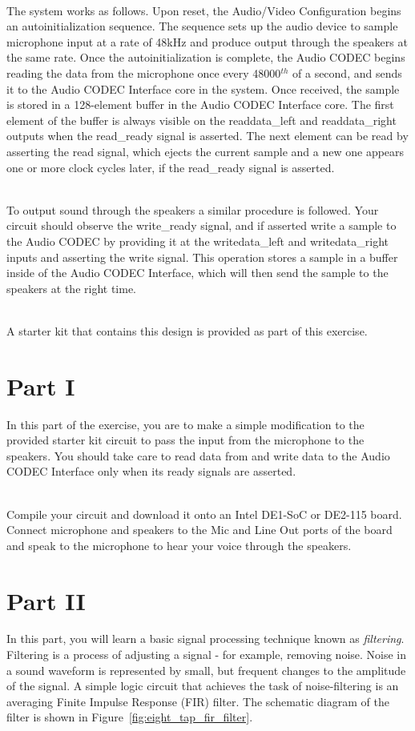 \documentclass[epsfig,10pt,fullpage]{article}
\begin{document}
~\\
The system works as follows. Upon reset, the {\sf Audio/Video Configuration} begins an autoinitialization sequence. The sequence sets up the
audio device to sample microphone input at a rate of 48kHz and produce output through 
the speakers at the same rate.
Once the autoinitialization is complete, the {\sf Audio CODEC} begins reading the data from the microphone once every 48000$^{th}$ of a second, and sends it
to the {\sf Audio CODEC Interface} core in the system. Once received, the sample is stored in a 128-element buffer in the {\sf Audio CODEC Interface} core.
The first element of the buffer is always visible on the {\sf readdata\_left} and {\sf readdata\_right} outputs when the {\sf read\_ready} signal is asserted.
The next element can be read by asserting the {\sf read} signal, which ejects the current sample and a new one appears one or more clock cycles later, if
the {\sf read\_ready} signal is asserted.

~\\
To output sound through the speakers a similar procedure is followed. Your circuit should observe the {\sf write\_ready} signal, and if asserted
write a sample to the Audio CODEC by providing it at the {\sf writedata\_left} and {\sf writedata\_right} inputs and asserting the {\sf write} signal.
This operation stores a sample in a buffer inside of the {\sf Audio CODEC Interface}, which will then send the sample to the speakers at the right time.

~\\
A starter kit that contains this design is provided as part of this exercise.

\section*{Part I}
In this part of the exercise, you are to make a simple modification to the provided
starter kit circuit to pass the input from the microphone to the speakers. You should
take care to read data from and write data to the {\sf Audio CODEC Interface} only when its ready signals are asserted.

~\\
Compile your circuit and download it onto an Intel DE1-SoC or DE2-115 board. Connect microphone and speakers to the {\sf Mic} and {\sf Line Out}
ports of the board and speak to the microphone to hear your voice through the speakers.

\section*{Part II}
In this part, you will learn a basic signal processing technique known as {\it filtering}. Filtering is a process of adjusting a signal -
for example, removing noise. Noise in a sound waveform is represented by small, but frequent changes to the amplitude of the signal. A simple logic
circuit that achieves the task of noise-filtering is an averaging Finite Impulse Response (FIR) filter. The schematic diagram of the filter
is shown in Figure~\ref{fig:eight_tap_fir_filter}.
\end{document}
